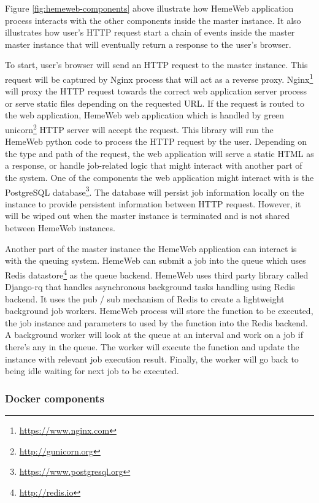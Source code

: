 \vspace{1cm}

Figure \ref{fig:hemeweb-components} above illustrate how HemeWeb  application process interacts with the other components inside the master instance. It also illustrates how user's HTTP request start a chain of events inside the master master instance that will eventually return a response to the user's browser.

To start, user's browser will send an HTTP request to the master instance. This request will be captured by Nginx process that will act as a reverse proxy.  Nginx\footnote{\url{https://www.nginx.com}} will proxy the HTTP request towards the correct web application server process or serve static files depending on the requested URL. If the request is routed to the web application, HemeWeb web application which is handled by green unicorn\footnote{\url{http://gunicorn.org}} HTTP server will accept the request. This library will run the HemeWeb python code to process the HTTP request by the user. Depending on the type and path of the request, the web application will serve a static HTML as a response, or handle job-related logic that might interact with another part of the system. One of the components the web application might interact with is the PostgreSQL database\footnote{\url{https://www.postgresql.org}}. The database will persist job information locally on the instance to provide persistent information between HTTP request. However, it will be wiped out when the master instance is terminated and is not shared between HemeWeb instances.

Another part of the master instance the HemeWeb application can interact is with the queuing system. HemeWeb can submit a job into the queue which uses Redis datastore\footnote{\url{http://redis.io}} as the queue backend. HemeWeb uses third party library called Django-rq that handles asynchronous background tasks handling using Redis backend. It uses the pub / sub mechanism of Redis to create a lightweight background job workers. HemeWeb process will store the function to be executed, the job instance and parameters to used by the function into the Redis backend. A background worker will look at the queue at an interval and work on a job if there's any in the queue. The worker will execute the function and update the instance with relevant job execution result. Finally, the worker will go back to being idle waiting for next job to be executed.

\subsubsection{Docker components}

